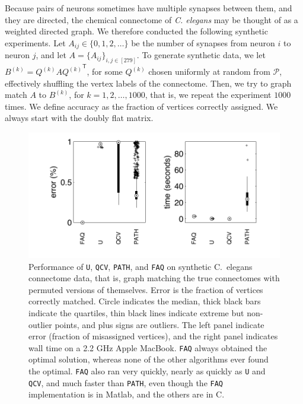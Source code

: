 \documentclass[11pt]{article}
\newcommand{\T}{^{\ensuremath{\mathsf{T}}}}           %
\providecommand{\mc}[1]{\mathcal{#1}}
\newcommand{\FAQ}{\texttt{FAQ} }
\begin{document}
Because pairs of neurons sometimes have multiple synapses between them, and they are directed, the chemical connectome of \emph{C. elegans} may be thought of as a weighted directed graph.
We therefore conducted the following synthetic experiments.  
Let $A_{ij} \in \{0,1,2,\ldots\}$ be the number of synapses from neuron $i$ to neuron $j$, and let $A=\{A_{ij}\}_{i,j \in [279]}$.  To generate synthetic data, we let $B^{(k)}=Q^{(k)} A {Q^{(k)}}\T$, for some $Q^{(k)}$ chosen uniformly at random from $\mc{P}$, effectively shuffling the vertex labels of the connectome.  Then, we try to graph match $A$ to $B^{(k)}$, for  $k =1,2,\ldots, 1000$, that is, we repeat the experiment $1000$ times.  We define accuracy as the fraction of vertices correctly assigned. We always start with the doubly flat matrix.


\begin{figure}[htbp]
	\centering
		\includegraphics[width=0.5\linewidth]{chemicalConnectome.pdf}
	\caption{Performance of \texttt{U}, \texttt{QCV}, \texttt{PATH}, and \FAQ on synthetic C.~elegans connectome data, that is, graph matching the true connectomes with permuted versions of themselves.  Error is the fraction of vertices correctly matched.  Circle indicates the median, thick black bars indicate the quartiles, thin black lines indicate extreme but non-outlier points, and plus signs are outliers. The left panel indicate error (fraction of misassigned vertices), and the right panel indicates wall time on a 2.2 GHz Apple MacBook.   \FAQ always obtained the optimal solution, whereas none of the other algorithms ever found the optimal.    \FAQ also ran very quickly, nearly as quickly as \texttt{U} and \texttt{QCV}, and much faster than \texttt{PATH}, even though the \FAQ implementation is in Matlab, and the others are in C.}
	\label{fig:connectomes}
\end{figure}
\end{document}
